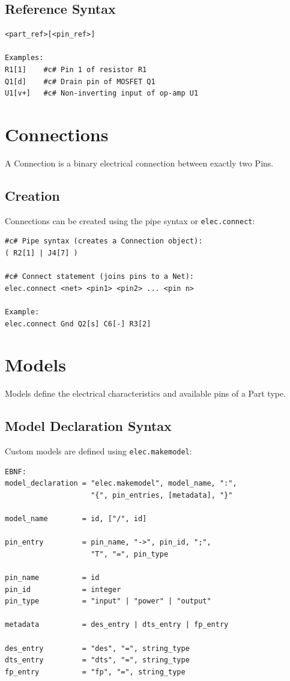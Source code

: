 \subsection{Reference Syntax}
\begin{verbatim}
<part_ref>[<pin_ref>]

Examples:
R1[1]    #c# Pin 1 of resistor R1
Q1[d]    #c# Drain pin of MOSFET Q1
U1[v+]   #c# Non-inverting input of op-amp U1
\end{verbatim}

\section{Connections}
A Connection is a binary electrical connection between exactly two Pins.

\subsection{Creation}
Connections can be created using the pipe syntax or \texttt{elec.connect}:
\begin{verbatim}
#c# Pipe syntax (creates a Connection object):
( R2[1] | J4[7] )

#c# Connect statement (joins pins to a Net):
elec.connect <net> <pin1> <pin2> ... <pin n>

Example:
elec.connect Gnd Q2[s] C6[-] R3[2]
\end{verbatim}

\section{Models}
Models define the electrical characteristics and available pins of a Part type.

\subsection{Model Declaration Syntax}
Custom models are defined using \texttt{elec.makemodel}:
\begin{verbatim}
EBNF:
model_declaration = "elec.makemodel", model_name, ":",
                    "{", pin_entries, [metadata], "}"

model_name        = id, ["/", id]

pin_entry         = pin_name, "->", pin_id, ";",
                    "T", "=", pin_type

pin_name          = id
pin_id            = integer
pin_type          = "input" | "power" | "output"

metadata          = des_entry | dts_entry | fp_entry

des_entry         = "des", "=", string_type
dts_entry         = "dts", "=", string_type
fp_entry          = "fp", "=", string_type
\end{verbatim}

